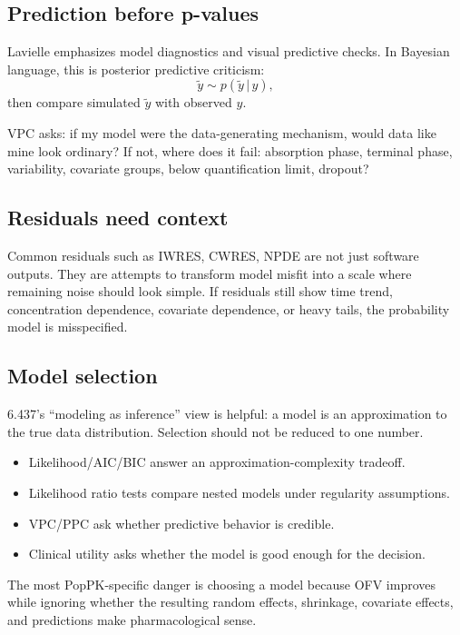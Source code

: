 \documentclass[a4paper]{article}
\newcommand{\given}{\,|\,}
\begin{document}
\subsection{Prediction before p-values}

Lavielle emphasizes model diagnostics and visual predictive checks. In Bayesian language, this is posterior predictive criticism:
\[
  \tilde y \sim p(\tilde y\given y),
\]
then compare simulated \(\tilde y\) with observed \(y\).

VPC asks: if my model were the data-generating mechanism, would data like mine look ordinary? If not, where does it fail: absorption phase, terminal phase, variability, covariate groups, below quantification limit, dropout?

\subsection{Residuals need context}

Common residuals such as IWRES, CWRES, NPDE are not just software outputs. They are attempts to transform model misfit into a scale where remaining noise should look simple. If residuals still show time trend, concentration dependence, covariate dependence, or heavy tails, the probability model is misspecified.

\subsection{Model selection}

6.437's ``modeling as inference'' view is helpful: a model is an approximation to the true data distribution. Selection should not be reduced to one number.

\begin{itemize}[leftmargin=2em]
  \item Likelihood/AIC/BIC answer an approximation-complexity tradeoff.
  \item Likelihood ratio tests compare nested models under regularity assumptions.
  \item VPC/PPC ask whether predictive behavior is credible.
  \item Clinical utility asks whether the model is good enough for the decision.
\end{itemize}

\begin{remark}
  The most PopPK-specific danger is choosing a model because OFV improves while ignoring whether the resulting random effects, shrinkage, covariate effects, and predictions make pharmacological sense.
\end{remark}
\end{document}

